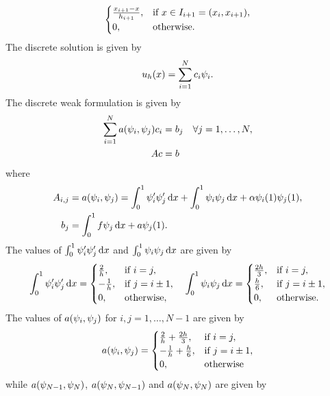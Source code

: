 \documentclass[english]{exercise}
\begin{document}
\begin{enumerate}
\[\begin{cases}
                \frac{x_{i + 1} - x}{h_{i + 1}}, & \text{if }x \in I_{i + 1} = \parentheses*{x_i, x_{i + 1}},\\
                0, & \text{otherwise}.
            \end{cases}
        \]
        The discrete solution is given by
        \[
            u_h\parentheses*{x} = \sum_{i = 1}^N c_i \psi_i.
        \]
        The discrete weak formulation is given by
        \begin{align*}
            \sum_{i = 1}^N a\parentheses*{\psi_i, \psi_j}c_i &= b_j \quad \forall j = 1, \ldots, N,\\
            Ac &= b
        \end{align*}
        where
        \begin{align*}
            A_{i, j} &= a\parentheses*{\psi_i, \psi_j} = \int_0^1 \psi_i'\psi_j'\d x + \int_0^1 \psi_i \psi_j \d x + \alpha\psi_i\parentheses*{1}\psi_j\parentheses*{1},\\
            b_j &= \int_0^1f\psi_j \d x + a\psi_j\parentheses*{1}.
        \end{align*}
        The values of \(\int_0^1 \psi_i'\psi_j'\mathop{\mathrm{d}\!} x\) and \(\int_0^1 \psi_i \psi_j \mathop{\mathrm{d}\!} x\) are given by
        \[
            \int_0^1 \psi_i'\psi_j'\mathop{\mathrm{d}\!} x = \begin{cases}
                \frac{2}{h}, & \text{if }i = j,\\
                -\frac{1}{h}, & \text{if }j = i \pm 1,\\
                0, & \text{otherwise},
            \end{cases} \quad \int_0^1 \psi_i \psi_j \mathop{\mathrm{d}\!} x = \begin{cases}
                \frac{2h}{3}, & \text{if }i = j,\\
                \frac{h}{6}, & \text{if }j = i \pm 1,\\
                0, & \text{otherwise}.
            \end{cases}
        \]
        The values of \(a\parentheses*{\psi_i, \psi_j}\) for \(i, j = 1, \ldots, N - 1\) are given by
        \[
            a\parentheses*{\psi_i, \psi_j} = \begin{cases}
                \frac{2}{h} + \frac{2h}{3}, & \text{if }i = j,\\
                -\frac{1}{h} + \frac{h}{6}, & \text{if }j = i \pm 1,\\
                0, & \text{otherwise}
            \end{cases}
        \]
        while \(a\parentheses*{\psi_{N - 1}, \psi_N}\), \(a\parentheses*{\psi_N, \psi_{N - 1}}\) and \(a\parentheses*{\psi_N, \psi_N}\) are given by

\end{enumerate}
\end{document}
